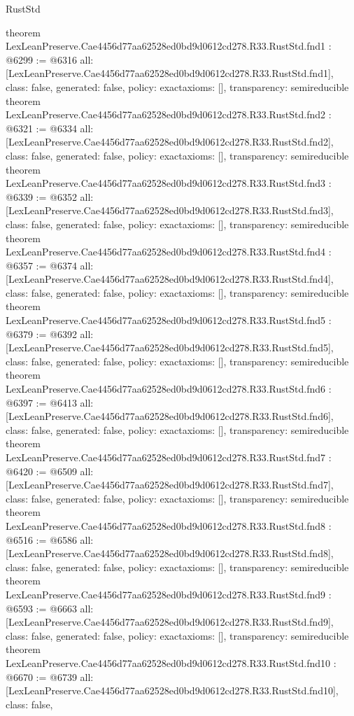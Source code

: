 \begin{lexlean}{RustStd}
\begin{coremodule}
{}
theorem LexLeanPreserve.Cae4456d77aa62528ed0bd9d0612cd278.R33.RustStd.fnd1 : @6299 := @6316 {
  all: [LexLeanPreserve.Cae4456d77aa62528ed0bd9d0612cd278.R33.RustStd.fnd1],
  class: false,
  generated: false,
  policy: exact{axioms: []},
  transparency: semireducible
}
theorem LexLeanPreserve.Cae4456d77aa62528ed0bd9d0612cd278.R33.RustStd.fnd2 : @6321 := @6334 {
  all: [LexLeanPreserve.Cae4456d77aa62528ed0bd9d0612cd278.R33.RustStd.fnd2],
  class: false,
  generated: false,
  policy: exact{axioms: []},
  transparency: semireducible
}
theorem LexLeanPreserve.Cae4456d77aa62528ed0bd9d0612cd278.R33.RustStd.fnd3 : @6339 := @6352 {
  all: [LexLeanPreserve.Cae4456d77aa62528ed0bd9d0612cd278.R33.RustStd.fnd3],
  class: false,
  generated: false,
  policy: exact{axioms: []},
  transparency: semireducible
}
theorem LexLeanPreserve.Cae4456d77aa62528ed0bd9d0612cd278.R33.RustStd.fnd4 : @6357 := @6374 {
  all: [LexLeanPreserve.Cae4456d77aa62528ed0bd9d0612cd278.R33.RustStd.fnd4],
  class: false,
  generated: false,
  policy: exact{axioms: []},
  transparency: semireducible
}
theorem LexLeanPreserve.Cae4456d77aa62528ed0bd9d0612cd278.R33.RustStd.fnd5 : @6379 := @6392 {
  all: [LexLeanPreserve.Cae4456d77aa62528ed0bd9d0612cd278.R33.RustStd.fnd5],
  class: false,
  generated: false,
  policy: exact{axioms: []},
  transparency: semireducible
}
theorem LexLeanPreserve.Cae4456d77aa62528ed0bd9d0612cd278.R33.RustStd.fnd6 : @6397 := @6413 {
  all: [LexLeanPreserve.Cae4456d77aa62528ed0bd9d0612cd278.R33.RustStd.fnd6],
  class: false,
  generated: false,
  policy: exact{axioms: []},
  transparency: semireducible
}
theorem LexLeanPreserve.Cae4456d77aa62528ed0bd9d0612cd278.R33.RustStd.fnd7 : @6420 := @6509 {
  all: [LexLeanPreserve.Cae4456d77aa62528ed0bd9d0612cd278.R33.RustStd.fnd7],
  class: false,
  generated: false,
  policy: exact{axioms: []},
  transparency: semireducible
}
theorem LexLeanPreserve.Cae4456d77aa62528ed0bd9d0612cd278.R33.RustStd.fnd8 : @6516 := @6586 {
  all: [LexLeanPreserve.Cae4456d77aa62528ed0bd9d0612cd278.R33.RustStd.fnd8],
  class: false,
  generated: false,
  policy: exact{axioms: []},
  transparency: semireducible
}
theorem LexLeanPreserve.Cae4456d77aa62528ed0bd9d0612cd278.R33.RustStd.fnd9 : @6593 := @6663 {
  all: [LexLeanPreserve.Cae4456d77aa62528ed0bd9d0612cd278.R33.RustStd.fnd9],
  class: false,
  generated: false,
  policy: exact{axioms: []},
  transparency: semireducible
}
theorem LexLeanPreserve.Cae4456d77aa62528ed0bd9d0612cd278.R33.RustStd.fnd10 : @6670 := @6739 {
  all: [LexLeanPreserve.Cae4456d77aa62528ed0bd9d0612cd278.R33.RustStd.fnd10],
  class: false,
}
\end{coremodule}
\end{lexlean}
